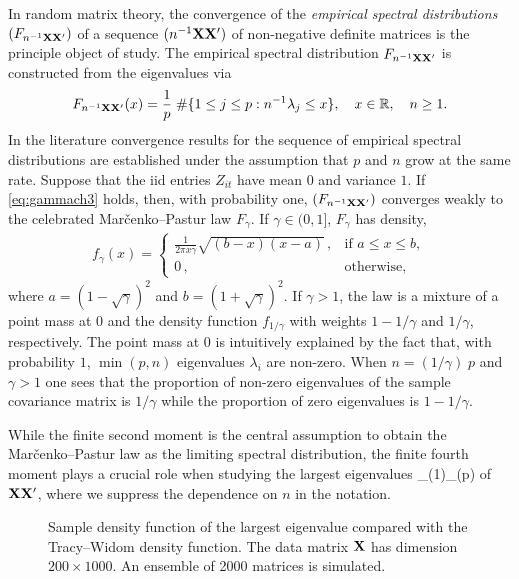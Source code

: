 In random matrix theory,  the convergence of the {\em empirical spectral distributions} $(F_{n^{-1}{\mathbf X} {\mathbf X}'})$ of a sequence $(n^{-1}{\mathbf X} {\mathbf X}')$ of non-negative definite matrices is the principle object of study. The empirical spectral distribution $F_{n^{-1}{\mathbf X} {\mathbf X}'}$ is constructed from the eigenvalues via
\begin{equation*}
F_{n^{-1}{\mathbf X} {\mathbf X}'}(x)= \frac{1}{p}\; \# \{ 1\le j\le p : n^{-1} \lambda_j \le x \}, \quad x\in \mathbb{R},\quad n\ge1.
\end{equation*}
In the literature convergence results for the sequence of empirical spectral distributions are established under the assumption that $p$ and $n$ grow at the same rate.
Suppose that the iid entries $Z_{it}$ have mean $0$ and variance $1$. If \eqref{eq:gammach3} holds, then, with probability one, $(F_{n^{-1}{\mathbf X} {\mathbf X}'})$ converges weakly to the celebrated Mar\v cenko--Pastur law $F_\gamma$. If $\gamma \in (0,1]$,  $F_\gamma$  has density,
\begin{eqnarray}\label{eq:MPch3}
f_\gamma(x) =
\left\{\begin{array}{ll}
\frac{1}{2\pi x\gamma} \sqrt{(b-x)(x-a)} \,, & \mbox{if } a\le x \le b, \\
 0 \,, & \mbox{otherwise,}
\end{array}\right.
\end{eqnarray}\noindent
where $a=(1-\sqrt{\gamma})^2$ and $b=(1+\sqrt{\gamma})^2$. If $\gamma>1$, the \MP law is a mixture of a point mass at $0$ and the density function $f_{1/\gamma}$ with weights $1-1/\gamma$ and $1/\gamma$, respectively.  The point mass at $0$ is intuitively explained by the fact that, with probability $1$, $\min(p,n)$ eigenvalues $\lambda_i$ are non-zero. When $n=(1/\gamma) \; p$ and $\gamma >1$ one sees that the proportion of non-zero eigenvalues of the sample covariance matrix is $1/\gamma$ while the proportion of zero eigenvalues is $1-1/\gamma$.

While the finite second moment is the central assumption to obtain the Mar\v cenko--Pastur law as the limiting spectral distribution, the finite fourth moment plays a crucial role when studying the largest eigenvalues
\beam\label{eq:orderch3}
\la_{(1)}\ge \cdots \ge \la_{(p)}
\eeam
of ${\mathbf X}{\mathbf X}'$, where we suppress the dependence on $n$ in the notation.

\begin{figure}[htb!]
  \centering
  \caption{Sample density function of the largest eigenvalue compared
    with the Tracy--Widom density function. The data matrix $ {\mathbf X}$ has
    dimension $200 \times 1000$. An ensemble of 2000 matrices is
    simulated.}
  \label{fig:normal-3point-TW}
\end{figure}

